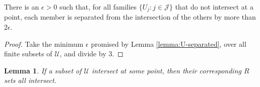 \documentclass{article}
\newtheorem{lemma}{Lemma}
\begin{document}
\begin{corollary} \label{cor:separated-small-enough}
  There is an $\epsilon > 0$ such that, for all families $\{U_j : j \in \mathcal{J}\}$ that do not intersect at a point, each member is separated from the intersection of the others by more than $2\epsilon$.
\end{corollary}
\begin{proof}
  Take the minimum $\epsilon$ promised by Lemma \ref{lemma:U-separated}, over all finite subsets of $\mathcal{U}$, and divide by $3$.
\end{proof}

\begin{lemma}
  If a subset of $\mathcal{U}$ intersect at some point, then their corresponding $R$ sets all intersect.
\end{lemma}
\end{document}
